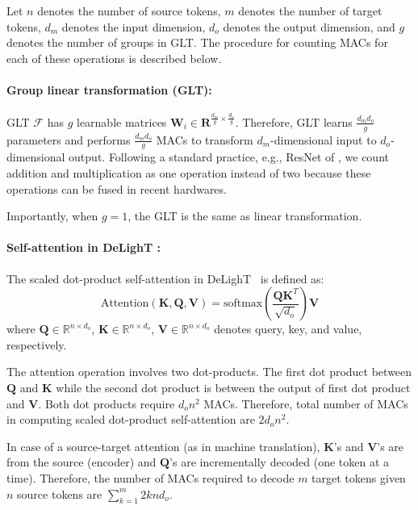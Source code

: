 Let $n$ denotes the number of source tokens, $m$ denotes the number of target tokens, $d_m$ denotes the input dimension, $d_o$ denotes the output dimension, and $g$ denotes the number of groups in GLT. The procedure for counting MACs for each of these operations is described below. 

\paragraph{Group linear transformation (GLT):} GLT $\mathcal{F}$ has $g$ learnable matrices $\mathbf{W}_i \in \mathbf{R}^{\frac{d_m}{g} \times \frac{d_o}{g}}$. Therefore, GLT learns \colorbox{red!20}{$\frac{d_md_o}{g}$} parameters and performs \colorbox{red!20}{$\frac{d_md_o}{g}$} MACs to transform $d_m$-dimensional input to $d_o$-dimensional output. Following a standard practice, e.g., ResNet of \citet{he2016deep}, we count addition and multiplication as one operation instead of two because these operations can be fused in recent hardwares.

Importantly, when $g=1$, the GLT is the same as linear transformation.

\paragraph{Self-attention in DeLighT :} The scaled dot-product self-attention in DeLighT ~is defined as:
\begin{equation}
    \text{Attention}(\mathbf{K}, \mathbf{Q}, \mathbf{V}) = \text{softmax}\left(\frac{\mathbf{Q}\mathbf{K}^T}{\sqrt{d_o}}\right) \mathbf{V}
\end{equation}
where $\mathbf{Q} \in \mathbb{R}^{n \times d_o}$, $\mathbf{K} \in \mathbb{R}^{n \times d_o}$, $\mathbf{V} \in \mathbb{R}^{n \times d_o}$ denotes query, key, and value, respectively.

The attention operation involves two dot-products. The first dot product between $\mathbf{Q}$ and $\mathbf{K}$ while the second dot product is between the output of first dot product and $\mathbf{V}$. Both dot products require $d_on^2$ MACs. Therefore, total number of MACs in computing scaled dot-product self-attention are \colorbox{red!20}{$2d_on^2$}.

In case of a source-target attention (as in machine translation), $\mathbf{K}$'s and $\mathbf{V}$'s are from the source (encoder) and $\mathbf{Q}$'s are incrementally decoded (one token at a time). Therefore, the number of MACs required to decode $m$ target tokens given $n$ source tokens are \colorbox{red!20}{$\sum\limits_{k=1}^{m} 2knd_o$}.

